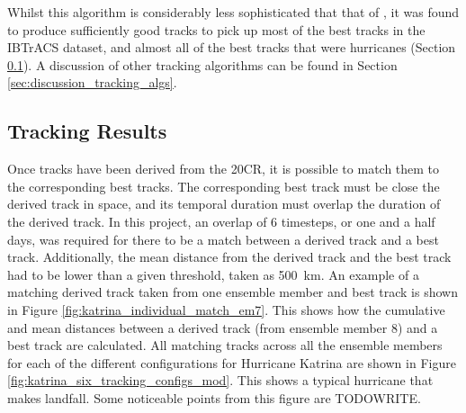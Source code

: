 \documentclass[pdftex,12pt,a4paper]{report}
\begin{document}
Whilst this algorithm is considerably less sophisticated that that of \textcite{hodges1994general},
it was found to produce sufficiently good tracks to pick up most of the best tracks in the IBTrACS
dataset, and almost all of the best tracks that were hurricanes (Section
\ref{sec:results_tracking}). A discussion of other tracking algorithms can be found in Section
\ref{sec:discussion_tracking_algs}.

\subsection{Tracking Results}
\label{sec:results_tracking}

Once tracks have been derived from the 20CR, it is possible to match them to the corresponding best
tracks. The corresponding best track must be close the derived track in space, and its temporal
duration must overlap the duration of the derived track. In this project, an overlap of 6 timesteps,
or one and a half days, was required for there to be a match between a derived track and a best
track. Additionally, the mean distance from the derived track and the best track had to be lower
than a given threshold, taken as \SI{500}{km}. An example of a matching derived track taken from
one ensemble member and best track is shown in Figure \ref{fig:katrina_individual_match_em7}.
This shows how the cumulative and mean distances between a derived track (from ensemble member 8)
and a best track are calculated. All matching tracks across all the ensemble members for each of the
different configurations for Hurricane Katrina are shown in Figure
\ref{fig:katrina_six_tracking_configs_mod}. This shows a typical hurricane that makes landfall. Some
noticeable points from this figure are TODOWRITE.
\end{document}
